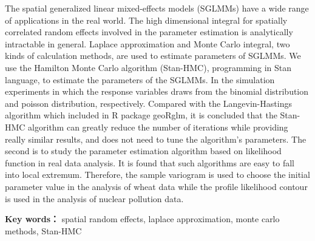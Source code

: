 The spatial generalized linear mixed-effects models (SGLMMs) have a wide range of applications in the real world. The high dimensional integral for spatially correlated random effects involved in the parameter estimation is analytically intractable in general. Laplace approximation and Monte Carlo integral, two kinds of calculation methods, are used to estimate parameters of SGLMMs. We use the Hamilton Monte Carlo algorithm (Stan-HMC), programming in Stan language, to estimate the parameters of the SGLMMs. In the simulation experiments in which the response variables draws from the binomial distribution and poisson distribution, respectively. Compared with the Langevin-Hastings algorithm which included in R package geoRglm, it is concluded that the Stan-HMC algorithm can greatly reduce the number of iterations while providing really similar results, and does not need to tune the algorithm's parameters. The second is to study the parameter estimation algorithm based on likelihood function in real data analysis. It is found that such algorithms are easy to fall into local extremum. Therefore, the sample variogram is used to choose the initial parameter value in the analysis of wheat data while the profile likelihood contour is used in the analysis of nuclear pollution data.

%  

\medskip
\par

{\bf Key words：} spatial random effects, laplace approximation, monte carlo methods, Stan-HMC

\newpage 
\mbox{} 

